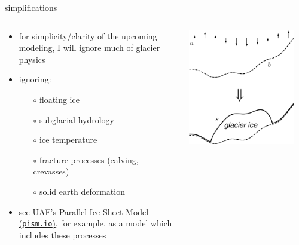 \documentclass[svgnames,
               hyperref={colorlinks,citecolor=DeepPink4,linkcolor=FireBrick,urlcolor=Maroon},
               usepdftitle=false]  %
               {beamer}
\begin{document}

\begin{frame}{simplifications}

\begin{columns}
\begin{column}{0.6\textwidth}
\begin{itemize}
\item for simplicity/clarity of the upcoming modeling, I will ignore much of glacier physics
\item \alert{ignoring}:
    \begin{itemize}
    \item[$\circ$] floating ice
    \item[$\circ$] subglacial hydrology
    \item[$\circ$] ice temperature
    \item[$\circ$] fracture processes (calving, crevasses)
    \item[$\circ$] solid earth deformation
    \end{itemize}

\medskip
\item {\footnotesize see UAF's \href{https://pism.io/}{Parallel Ice Sheet Model (\texttt{pism.io})}, for example, as a model which includes these processes}
\end{itemize}
\end{column}
\begin{column}{0.42\textwidth}
\hfill \includegraphics[width=0.9\textwidth]{../images/map-glacier-ice.png}
\end{column}
\end{columns}
\end{frame}
\end{document}
